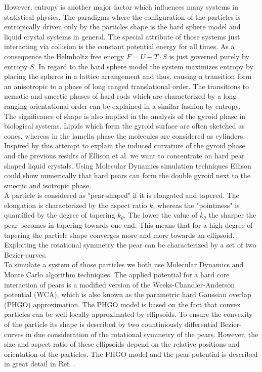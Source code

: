 \documentclass[epj,onecolumn]{webofc}
\begin{document}
However, entropy is another major factor which influences many systems in statistical physics. The paradigms where the configuration of the particles is entropically driven only by the particles shape is the hard sphere model 
and liquid crystal systems in general. The special attribute of those systems just interacting via collision is the constant potential energy for all times. As a consequence the Helmholtz free energy $F=U-T\cdot S$ is just governed 
purely by entropy $S$. In regard to the hard sphere model the system maximizes entropy by placing the spheres in a lattice arrangement and thus, causing a transition form an anisotropic to a phase of long ranged translational 
order. The transitions to nematic and smectic phases of hard rods which are characterized by a long ranging orientational order can be explained in a similar fashion by entropy.\\

The significance of shape is also implied in the analysis of the gyroid phase in biological systems. Lipids which form the gyroid surface are often sketched as cones, whereas in the lamella phase the molecules are considered 
as cylinders. Inspired by this attempt to explain the induced curvature of the gyroid phase and the previous results of Ellison et al. \cite{} we want to concentrate on hard pear shaped liquid crystals. Using Molecular Dynamics 
simulation techniques Ellison could show numerically that hard pears can form the double gyroid next to the smectic and isotropic phase.\\

A particle is considered as "pear-shaped" if it is elongated and tapered. The elongation is characterized by the aspect ratio $k$, whereas the "pointiness" is quantified by the degree of tapering $k_{\theta}$. The lower the value of 
$k_{\theta}$ the sharper the pear becomes in tapering towards one end. This means that for a high degree of tapering the particle shape converges more and more towards an ellipsoid. Exploiting the rotational symmetry the 
pear can be characterized by a set of two Bezier-curves.\\

To simulate a system of those particles we both use Molecular Dynamics and Monte Carlo algorithm techniques. The applied potential for a hard core interaction of pears is a modified version of the Weeks-Chandler-Anderson 
potential (WCA), which is also known as the parametric hard Gaussian overlap (PHGO) approximation. The PHGO model is based on the fact that convex particles can be well locally approximated by ellipsoids. To 
ensure the convexity of the particle its shape is described by two countiniously differential Bezier-curves in due consideration of the rotational symmetry of the pears. However, the size and aspect ratio of these ellipsoids depend 
on the relative positions and orientation of the particles. The PHGO model and the pear-potential is described in great detail in Ref. \cite{}.
\end{document}
